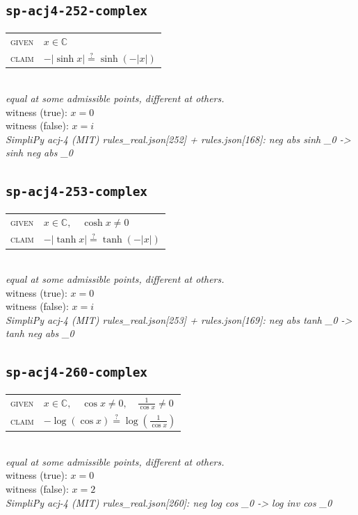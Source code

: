 \documentclass[11pt]{article}
\begin{document}
\subsection*{\texttt{sp-acj4-252-complex}}
\begin{tabular}{@{}l@{\quad}l@{}}
\textsc{given} & $x \in \mathbb{C}$ \\[4pt]
\textsc{claim} & $\displaystyle -\left|\sinh x\right| \overset{?}{=} \sinh\left(-\left|x\right|\right)$ \\
\end{tabular}\\[2pt]
{\small\emph{equal at some admissible points, different at others.}}\\
{\footnotesize\color{gray}witness (true): $x = 0$}\\
{\footnotesize\color{gray}witness (false): $x = i$}\\
\emph{SimpliPy acj-4 (MIT) rules\_real.json[252] + rules.json[168]: neg abs sinh \_0  ->  sinh neg abs \_0}\\

\subsection*{\texttt{sp-acj4-253-complex}}
\begin{tabular}{@{}l@{\quad}l@{}}
\textsc{given} & $x \in \mathbb{C},\quad \cosh x \neq 0$ \\[4pt]
\textsc{claim} & $\displaystyle -\left|\tanh x\right| \overset{?}{=} \tanh\left(-\left|x\right|\right)$ \\
\end{tabular}\\[2pt]
{\small\emph{equal at some admissible points, different at others.}}\\
{\footnotesize\color{gray}witness (true): $x = 0$}\\
{\footnotesize\color{gray}witness (false): $x = i$}\\
\emph{SimpliPy acj-4 (MIT) rules\_real.json[253] + rules.json[169]: neg abs tanh \_0  ->  tanh neg abs \_0}\\

\subsection*{\texttt{sp-acj4-260-complex}}
\begin{tabular}{@{}l@{\quad}l@{}}
\textsc{given} & $x \in \mathbb{C},\quad \cos x \neq 0,\quad \frac{1}{\cos x} \neq 0$ \\[4pt]
\textsc{claim} & $\displaystyle -\log\left(\cos x\right) \overset{?}{=} \log\left(\frac{1}{\cos x}\right)$ \\
\end{tabular}\\[2pt]
{\small\emph{equal at some admissible points, different at others.}}\\
{\footnotesize\color{gray}witness (true): $x = 0$}\\
{\footnotesize\color{gray}witness (false): $x = 2$}\\
\emph{SimpliPy acj-4 (MIT) rules\_real.json[260]: neg log cos \_0  ->  log inv cos \_0}\\
\end{document}
